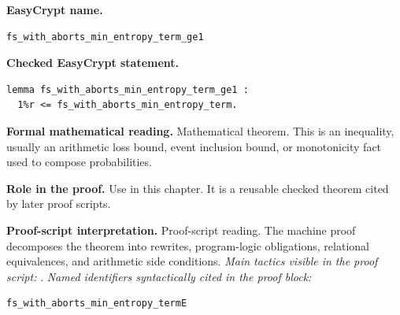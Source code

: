 \begin{formaltheorem}
\noindent\textbf{EasyCrypt name.}
\begin{lstlisting}[language=EasyCrypt,basicstyle=\ttfamily\scriptsize]
fs_with_aborts_min_entropy_term_ge1
\end{lstlisting}
\noindent\textbf{Checked EasyCrypt statement.}
\begin{lstlisting}[language=EasyCrypt,basicstyle=\ttfamily\scriptsize]
lemma fs_with_aborts_min_entropy_term_ge1 :
  1%r <= fs_with_aborts_min_entropy_term.
\end{lstlisting}
\noindent\textbf{Formal mathematical reading.}
Mathematical theorem. This is an inequality, usually an arithmetic loss bound, event inclusion bound, or monotonicity fact used to compose probabilities.

\noindent\textbf{Role in the proof.}
Use in this chapter. It is a reusable checked theorem cited by later proof scripts.

\noindent\textbf{Proof-script interpretation.}
Proof-script reading. The machine proof decomposes the theorem into rewrites, program-logic obligations, relational equivalences, and arithmetic side conditions.
\emph{Main tactics visible in the proof script:} .
\emph{Named identifiers syntactically cited in the proof block:}
\begin{lstlisting}[language=EasyCrypt,basicstyle=\ttfamily\scriptsize]
fs_with_aborts_min_entropy_termE
\end{lstlisting}

\end{formaltheorem}


